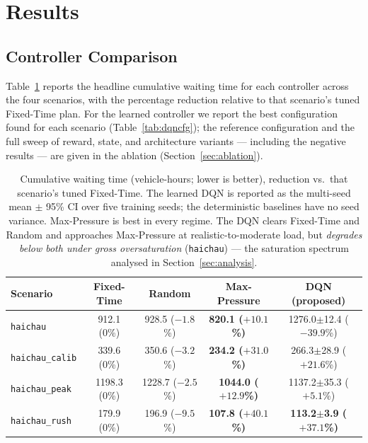 \section{Results}
\label{sec:results}

\subsection{Controller Comparison}

Table~\ref{tab:waiting} reports the headline cumulative waiting time for each controller
across the four scenarios, with the percentage reduction relative to that scenario's tuned
Fixed-Time plan. For the learned controller we report the best configuration found for
each scenario (Table~\ref{tab:dqncfg}); the reference configuration and the full sweep of
reward, state, and architecture variants --- including the negative results --- are given
in the ablation (Section~\ref{sec:ablation}).

\begin{table}[H]
\centering
\caption{Cumulative waiting time (vehicle-hours; lower is better), reduction vs.\ that
scenario's tuned Fixed-Time. The learned DQN is reported as the multi-seed mean $\pm$ 95\% CI
over five training seeds; the deterministic baselines have no seed variance. Max-Pressure is
best in every regime. The DQN clears Fixed-Time and Random and approaches Max-Pressure at
realistic-to-moderate load, but \emph{degrades below both under gross oversaturation}
(\texttt{haichau}) --- the saturation spectrum analysed in Section~\ref{sec:analysis}.}
\label{tab:waiting}
\begin{tabular}{@{}lcccc@{}}
\toprule
\textbf{Scenario} & \textbf{Fixed-Time} & \textbf{Random} & \textbf{Max-Pressure} & \textbf{DQN (proposed)} \\
\midrule
\texttt{haichau}       & 912.1 (0\%) & 928.5 ($-1.8$\%) & \textbf{820.1 ($+10.1$\%)} & 1276.0$\pm$12.4 ($-39.9$\%) \\
\texttt{haichau\_calib}& 339.6 (0\%) & 350.6 ($-3.2$\%) & \textbf{234.2 ($+31.0$\%)} & 266.3$\pm$28.9 ($+21.6$\%) \\
\texttt{haichau\_peak} & 1198.3 (0\%)& 1228.7 ($-2.5$\%)& \textbf{1044.0 ($+12.9$\%)}& 1137.2$\pm$35.3 ($+5.1$\%) \\
\texttt{haichau\_rush} & 179.9 (0\%) & 196.9 ($-9.5$\%) & \textbf{107.8 ($+40.1$\%)} & \textbf{113.2$\pm$3.9 ($+37.1$\%)} \\
\bottomrule
\end{tabular}
\end{table}

